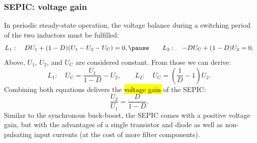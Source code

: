 \begin{frame}
	\frametitle{SEPIC: voltage gain}
	In periodic steady-state operation, the voltage balance during a switching period of the two inductors must be fulfilled:
	\begin{equation}
		L_1:\quad D U_1 + (1-D)(U_1-U_2-U_\mathrm{C})=0,\pause \qquad L_2:\quad -DU_\mathrm{C} + (1-D)U_2=0.
	\end{equation}
	Above, $U_1$, $U_2$, and $U_\mathrm{C}$ are considered constant. \pause From those we can derive:
	\begin{equation}
		L_1:\quad U_\mathrm{C}=\frac{U_1}{1-D}-U_2, \qquad L_2:\quad U_\mathrm{C}=\left(\frac{1}{D}-1\right)U_2.
	\end{equation}\pause
	Combining both equations delivers the \hl{voltage gain} of the SEPIC:
	\begin{equation}
		\frac{U_2}{U_1} = \frac{D}{1-D}.
	\end{equation}\pause
	Similar to the synchronous buck-boost, the SEPIC comes with a positive voltage gain, but with the advantages of a single transistor and diode as well as non-pulsating input currents (at the cost of more filter components).
\end{frame}

